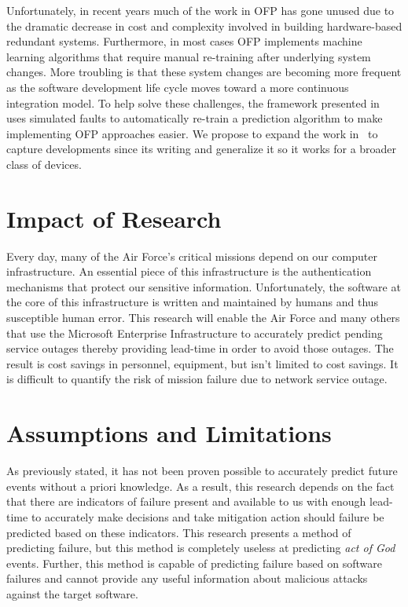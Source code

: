 Unfortunately, in recent years much of the work in OFP has gone unused due to
the dramatic decrease in cost and complexity involved in building
hardware-based redundant systems.  Furthermore, in most cases OFP implements
machine learning algorithms that require manual re-training after underlying
system changes.  More troubling is that these system changes are becoming more
frequent as the software development life cycle moves toward a more continuous
integration model.  To help solve these challenges, the framework presented
in~\cite{irrera2015} uses simulated faults to automatically re-train a
prediction algorithm to make implementing OFP approaches easier.  We propose to
expand the work in~\cite{irrera2015} to capture developments since its writing
and generalize it so it works for a broader class of devices.

\section{Impact of Research}
Every day, many of the Air Force's critical missions depend on our computer
infrastructure.  An essential piece of this infrastructure is the
authentication mechanisms that protect our sensitive information.
Unfortunately, the software at the core of this infrastructure is written and
maintained by humans and thus susceptible human error.  This research will
enable the Air Force and many others that use the Microsoft Enterprise
Infrastructure to accurately predict pending service outages thereby providing
lead-time in order to avoid those outages.  The result is cost savings in
personnel, equipment, but isn't limited to cost savings.  It is difficult to
quantify the risk of mission failure due to network service outage.

\section{Assumptions and Limitations}
As previously stated, it has not been proven possible to accurately predict
future events without a priori knowledge.  As a result, this research depends
on the fact that there are indicators of failure present and available to us
with enough lead-time to accurately make decisions and take mitigation action
should failure be predicted based on these indicators.  This research presents
a method of predicting failure, but this method is completely useless at
predicting \emph{act of God} events.  Further, this method is capable of
predicting failure based on software failures and cannot provide any useful
information about malicious attacks against the target software.

